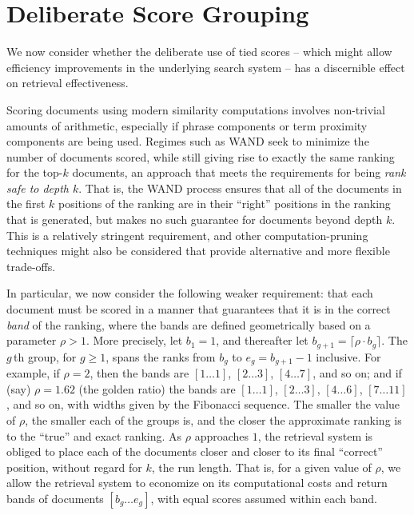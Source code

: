 \section{Deliberate Score Grouping}
\label{sec-roundingoff}

We now consider whether the deliberate use of tied scores -- which
might allow efficiency improvements in the underlying search system
-- has a discernible effect on retrieval effectiveness.


Scoring documents using modern similarity computations involves
non-trivial amounts of arithmetic, especially if phrase components or
term proximity components are being used.
Regimes such as WAND {\citep{bchsz03cikm}} seek to minimize the
number of documents scored, while still giving rise to exactly the
same ranking for the top-$k$ documents, an approach that meets the
requirements for being {\emph{rank safe to depth $k$}}.
That is, the WAND process ensures that all of the documents in the
first $k$ positions of the ranking are in their ``right'' positions
in the ranking that is generated, but makes no such guarantee for
documents beyond depth $k$.
This is a relatively stringent requirement, and other
computation-pruning techniques might also be considered that provide
alternative and more flexible trade-offs.

In particular, we now consider the following weaker requirement: that
each document must be scored in a manner that guarantees that it is
in the correct {\emph{band}} of the ranking, where the bands are
defined geometrically based on a parameter $\rho>1$.
More precisely, let $b_1=1$, and thereafter let
$b_{g+1}=\lceil{\rho\cdot b_g}\rceil$.
The $g$\,th group, for $g\ge1$, spans the ranks from $b_g$ to
$e_g=b_{g+1}-1$ inclusive.
For example, if $\rho=2$, then the bands are $[1\ldots1]$,
$[2\ldots3]$, $[4\ldots7]$, and so on; and if (say) $\rho=1.62$ (the
golden ratio) the bands are $[1\ldots1]$, $[2\ldots3]$, $[4\ldots6]$,
$[7\ldots11]$, and so on, with widths given by the Fibonacci
sequence.
The smaller the value of $\rho$, the smaller each of the groups is,
and the closer the approximate ranking is to the ``true'' and exact
ranking.
As $\rho$ approaches $1$, the retrieval system is obliged to place
each of the documents closer and closer to its final ``correct''
position, without regard for $k$, the run length.
That is, for a given value of $\rho$, we allow the retrieval system
to economize on its computational costs and return bands of documents
$[b_g\ldots e_g]$, with equal scores assumed within each band.

